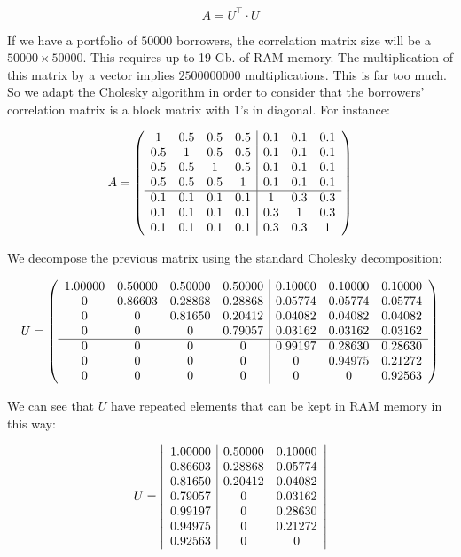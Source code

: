\documentclass[a4paper,12pt,final]{article}
\begin{document}
\begin{displaymath}
A = U^{\top} \cdot U
\end{displaymath}

If we have a portfolio of $50000$ borrowers, the correlation matrix size will
be a $50000 \times 50000$. This requires up to 19 Gb. of RAM memory. The 
multiplication of this matrix by a vector implies $2500000000$ multiplications.
This is far too much. So we adapt the Cholesky algorithm in order to consider that 
the borrowers' correlation matrix is a block matrix with $1$'s in diagonal. 
For instance:

\begin{displaymath}
A = \left(
\begin{array}{cccc|ccc}
1   & 0.5 & 0.5 & 0.5 & 0.1 & 0.1 & 0.1 \cr
0.5 & 1   & 0.5 & 0.5 & 0.1 & 0.1 & 0.1 \cr
0.5 & 0.5 & 1   & 0.5 & 0.1 & 0.1 & 0.1 \cr
0.5 & 0.5 & 0.5 & 1   & 0.1 & 0.1 & 0.1 \cr
\hline
0.1 & 0.1 & 0.1 & 0.1 & 1   & 0.3 & 0.3 \cr
0.1 & 0.1 & 0.1 & 0.1 & 0.3 & 1   & 0.3 \cr
0.1 & 0.1 & 0.1 & 0.1 & 0.3 & 0.3 & 1
\end{array}
\right)
\end{displaymath}

We decompose the previous matrix using the standard Cholesky decomposition:

\begin{displaymath}
U = \left(
\begin{array}{cccc|ccc}
 1.00000 & 0.50000 & 0.50000 & 0.50000 & 0.10000 & 0.10000 & 0.10000 \cr
 0       & 0.86603 & 0.28868 & 0.28868 & 0.05774 & 0.05774 & 0.05774 \cr
 0       & 0       & 0.81650 & 0.20412 & 0.04082 & 0.04082 & 0.04082 \cr
 0       & 0       & 0       & 0.79057 & 0.03162 & 0.03162 & 0.03162 \cr
\hline
 0       & 0       & 0       & 0       & 0.99197 & 0.28630 & 0.28630 \cr
 0       & 0       & 0       & 0       & 0       & 0.94975 & 0.21272 \cr
 0       & 0       & 0       & 0       & 0       & 0       & 0.92563
\end{array}
\right)
\end{displaymath}

We can see that $U$ have repeated elements that can be kept in RAM memory in 
this way:

\begin{displaymath}
U = \left|
\begin{array}{c|cc}
 1.00000 & 0.50000 & 0.10000 \cr
 0.86603 & 0.28868 & 0.05774 \cr
 0.81650 & 0.20412 & 0.04082 \cr
 0.79057 & 0       & 0.03162 \cr
 0.99197 & 0       & 0.28630 \cr
 0.94975 & 0       & 0.21272 \cr
 0.92563 & 0       & 0
\end{array}
\right|
\end{displaymath}
\end{document}
